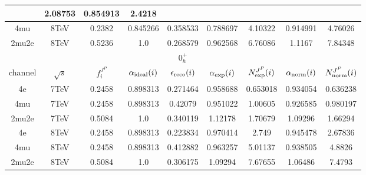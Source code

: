 \begin{table}[b]
\begin{tabular}{c c c c c c c c c}
 & 2.08753%
 & 0.854913 & 2.4218 \\ \hline 4mu & 8TeV & 0.2382 & 0.845266 & 0.358533 & 0.788697
 & 4.10322%
 & 0.914991 & 4.76026 \\ \hline 2mu2e & 8TeV & 0.5236 & 1.0  & 0.268579 & 0.962568
 & 6.76086%
 & 1.1167 & 7.84348 \\ \hline \hline 
 \multicolumn{9}{|c|}{$0^{+}_{h}$} \\ \hline 
channel & $\sqrt{s}$ & $f_{i}^{J^P}$ & $\alpha_{\rm ideal} (i)$ & $\epsilon_{\rm reco} (i)$ & $\alpha_{\rm exp} (i)$ & $N^{J^P}_{\rm exp} (i)$ & $\alpha_{\rm norm} (i)$ & $N^{J^P}_{\rm norm} (i)$\\ \hline 
4e & 7TeV & 0.2458 & 0.898313 & 0.271464 & 0.958688
 & 0.653018%
 & 0.934054 & 0.636238 \\ \hline 4mu & 7TeV & 0.2458 & 0.898313 & 0.42079 & 0.951022
 & 1.00605%
 & 0.926585 & 0.980197 \\ \hline 2mu2e & 7TeV & 0.5084 & 1.0  & 0.340119 & 1.12178
 & 1.70679%
 & 1.09296 & 1.66294 \\ \hline \hline 
4e & 8TeV & 0.2458 & 0.898313 & 0.223834 & 0.970414
 & 2.749%
 & 0.945478 & 2.67836 \\ \hline 4mu & 8TeV & 0.2458 & 0.898313 & 0.412882 & 0.963257
 & 5.01137%
 & 0.938505 & 4.8826 \\ \hline 2mu2e & 8TeV & 0.5084 & 1.0  & 0.306175 & 1.09294
 & 7.67655%
 & 1.06486 & 7.4793 \\ \hline \hline 
\end{tabular}
\label{table:HZZ4lyieldcorr_spin0}
\end{table}

